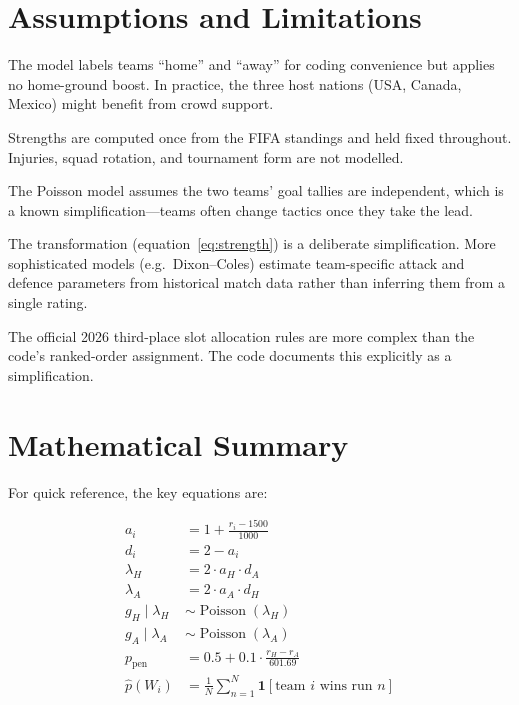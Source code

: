 \documentclass[12pt,a4paper]{article}
\newcommand{\Poi}{\operatorname{Poisson}}
\begin{document}
\section{Assumptions and Limitations}

\begin{description}[leftmargin=2em]
  \item[No home advantage.] The model labels teams ``home'' and ``away''
        for coding convenience but applies no home-ground boost.  In
        practice, the three host nations (USA, Canada, Mexico) might
        benefit from crowd support.
  \item[Static team strengths.] Strengths are computed once from the
        FIFA standings and held fixed throughout.  Injuries, squad
        rotation, and tournament form are not modelled.
  \item[Independent goals.] The Poisson model assumes the two teams' goal
        tallies are independent, which is a known simplification---teams
        often change tactics once they take the lead.
  \item[Linear FIFA-to-strength mapping.] The transformation
        (equation~\ref{eq:strength}) is a deliberate simplification.
        More sophisticated models (e.g.\ Dixon--Coles) estimate
        team-specific attack and defence parameters from historical match
        data rather than inferring them from a single rating.
  \item[Bracket simplification.] The official 2026 third-place slot
        allocation rules are more complex than the code's ranked-order
        assignment.  The code documents this explicitly as a simplification.
\end{description}

\section{Mathematical Summary}

For quick reference, the key equations are:

\begin{align}
  a_i &= 1 + \frac{r_i - 1500}{1000} \tag{attack strength}\\[4pt]
  d_i &= 2 - a_i \tag{defence strength}\\[4pt]
  \lambda_H &= 2 \cdot a_H \cdot d_A \tag{home expected goals}\\[4pt]
  \lambda_A &= 2 \cdot a_A \cdot d_H \tag{away expected goals}\\[4pt]
  g_H \mid \lambda_H &\sim \Poi(\lambda_H) \tag{home goals}\\[4pt]
  g_A \mid \lambda_A &\sim \Poi(\lambda_A) \tag{away goals}\\[4pt]
  p_{\text{pen}} &= 0.5 + 0.1 \cdot \frac{r_H - r_A}{601.69}
  \tag{penalty win probability}\\[4pt]
  \hat{p}(W_i) &= \frac{1}{N}\sum_{n=1}^{N}
    \mathbf{1}[\text{team } i \text{ wins run } n]
  \tag{Monte Carlo estimator}
\end{align}
\end{document}

